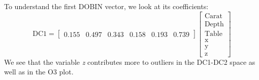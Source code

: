 \documentclass[letter,12pt]{article}
\begin{document}
To understand the first DOBIN vector, we look at its coefficients:
{\color{blue}
\begin{equation}\label{eq:ResWithVis2}
	\text{DC1} = \begin{bmatrix}
		0.155 & 0.497 & 0.343 & 0.158 & 0.193 & 0.739
	\end{bmatrix}
	\begin{bmatrix}
		\text{Carat} \\
		\text{Depth} \\
		\text{Table} \\
		\text{x}     \\
		\text{y}     \\
		\text{z}
	\end{bmatrix}
\end{equation}}
We see that the variable \textit{z} contributes more to outliers in the DC1-DC2 space as well as in the O3 plot.




\end{document}
